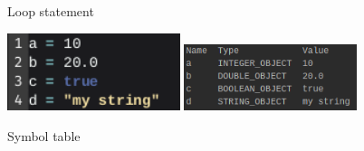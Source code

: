 \documentclass[
]{report}
\begin{document}
\begin{appendices}
\begin{figure}
		\caption{Loop statement}
		\label{fig:loop-statement}
	\end{figure}
	\begin{figure}
		\centering
		\includegraphics[width=0.45\textwidth]{symbol-table-code}
		\includegraphics[width=0.45\textwidth]{symbol-table}
		\caption{Symbol table}
		\label{fig:symbol-table}
	\end{figure}
	

\end{appendices}
\end{document}
